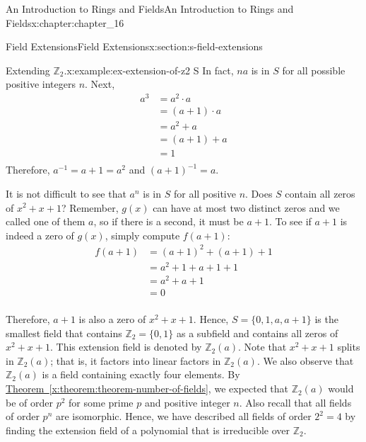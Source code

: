 \documentclass[oneside,10pt,]{book}
\newcommand{\xreffont}{\relax}
\numberwithin{equation}{section}
\begin{document}
\begin{chapterptx}{An Introduction to Rings and Fields}{}{An Introduction to Rings and Fields}{}{}{x:chapter:chapter_16}
\begin{sectionptx}{Field Extensions}{}{Field Extensions}{}{}{x:section:s-field-extensions}
\begin{example}{Extending \(\mathbb{Z}_2\).}{x:example:ex-extension-of-z2}
S\)   In fact, \(n a\) is in \(S\) for all possible positive integers \(n\).  Next,%
\begin{equation*}
\begin{split} a^3 & = a^2 \cdot  a \\
& = (a +1)\cdot a \\
&  = a^2+ a\\
&  = (a+1)+a\\
&  =1 \\
\end{split}
\end{equation*}
Therefore,  \(a^{-1}= a+1 = a^2\)   and \((a+1)^{-1}=a\).%
\par
It is not difficult to see that \(a^n\) is in \(S\) for all positive \(n\).  Does \(S\) contain all zeros of \(x^2 + x + 1\)? Remember, \(g(x)\) can have at most two distinct zeros and we called one of them \(a\), so if there is a second, it must be \(a + 1\). To see if \(a + 1\) is indeed a zero of \(g(x)\), simply compute \(f(a + 1)\):%
\begin{equation*}
\begin{split}
f(a+1) & = (a + 1)^2 + (a+1) + 1\\
&= a ^2 +1 + a+1+ 1 \\
& =a^2+a + 1\\
& =0\\
\end{split}
\end{equation*}
%
\par
Therefore, \(a + 1\) is also a zero of \(x^2 + x + 1\). Hence, \(S = \{0, 1, a, a + 1\}\) is the smallest field that contains \(\mathbb{Z}_2 = \{0, 1\}\) as a subfield and contains all zeros of \(x^2 + x + 1\). This extension field is denoted by \(\mathbb{Z}_2(a)\). Note that \(x^2 + x + 1\) splits in \(\mathbb{Z}_2(a)\); that is, it factors into linear factors in \(\mathbb{Z}_2(a)\). We also observe that \(\mathbb{Z}_2(a)\) is a field containing exactly four elements. By \hyperref[x:theorem:theorem-number-of-fields]{Theorem~{\xreffont\ref{x:theorem:theorem-number-of-fields}}}, we expected that \(\mathbb{Z}_2(a)\) would be of order \(p^2\) for some prime \(p\) and positive integer \(n\). Also recall that all fields of order \(p^n\) are isomorphic. Hence, we have described all fields of order \(2^2 =4\) by finding the extension field of a polynomial that is irreducible over \(\mathbb{Z}_2\).%
\end{example}

\end{sectionptx}
\end{chapterptx}
\end{document}
